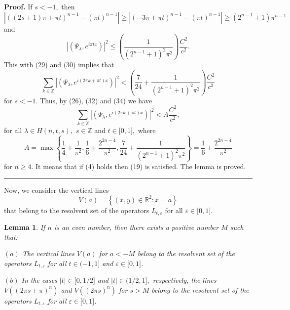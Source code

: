 \documentclass{article}%
\newtheorem{lemma}{Lemma}
{}
\newenvironment{proof}[1][Proof]{\textbf{#1.} }{\ \rule{0.5em}{0.5em}}
\begin{document}
\begin{proof}
If $s<-1,$ then
\[
\left\vert ((2s+1)\pi+\pi t)^{n-1}-(\pi t)^{n-1}\right\vert \geq\left\vert
(-3\pi+\pi t)^{n-1}-(\pi t)^{n-1}\right\vert \geq(2^{n-1}+1)\pi^{n-1}%
\]
and \
\begin{equation}
\left\vert \left(  \Psi_{\lambda},e^{i\pi tx}\right)  \right\vert ^{2}%
\leq\left(  \frac{1}{(2^{n-1}+1)^{2}\pi^{2}}\right)  \frac{C^{2}}{c^{2}}.
\tag{33}%
\end{equation}
This with (29) and (30) implies that
\begin{equation}
\sum_{k\in\mathbb{Z}}\left\vert \left(  \Psi_{\lambda},e^{i\left(  2\pi k+\pi
t\right)  x}\right)  \right\vert ^{2}<\left(  \frac{7}{24}+\frac{1}%
{(2^{n-1}+1)^{2}\pi^{2}}\right)  \frac{C^{2}}{c^{2}} \tag{34}%
\end{equation}
for $s<-1.$ Thus, by (26), (32) and (34) we have
\[
\sum_{k\in\mathbb{Z}}\left\vert \left(  \Psi_{\lambda},e^{i\left(  2\pi k+\pi
t\right)  x}\right)  \right\vert ^{2}<A\frac{C^{2}}{c^{2}},
\]
for all $\lambda\in H(n,t,s),$ $s\in\mathbb{Z}$ and $t\in\lbrack0,1],$ where
\[
A=\max\left\{  \frac{1}{4}+\frac{1}{\pi^{2}},\frac{1}{6}+\frac{2^{2n-4}}%
{\pi^{2}},\frac{7}{24}+\frac{1}{(2^{n-1}+1)^{2}\pi^{2}}\right\}  =\frac{1}%
{6}+\frac{2^{2n-4}}{\pi^{2}}%
\]
for $n\geq4.$ It means that if (4) holds then (19) is satisfied. The lemma is proved.
\end{proof}

Now, we consider the vertical lines
\[
V(a)=\left\{  (x,y)\in\mathbb{R}^{2}:x=a\right\}
\]
that belong to the resolvent set of the operators $L_{t,\varepsilon}$ for all
$\varepsilon\in\lbrack0,1].$

\begin{lemma}
If $n$ is an even number, then there exists a positive number $M$ such that:

$(a)$ The vertical lines $V(a)$ for $a<-M$ belong to the resolvent set of the
operators $L_{t,\varepsilon}$ for all $t\in(-1,1]$ and $\varepsilon\in
\lbrack0,1]$.

$(b)$ In the cases $\left\vert t\right\vert \in\lbrack0,1/2]$ and $\left\vert
t\right\vert \in(1/2,1],$ respectively, the lines $V(\left(  2\pi
s+\pi\right)  ^{n})$ and $V(\left(  2\pi s\right)  ^{n})$ for $s>M$ belong to
the resolvent set of the operators $L_{t,\varepsilon}$ for all $\varepsilon
\in\lbrack0,1]$.
\end{lemma}
\end{document}
